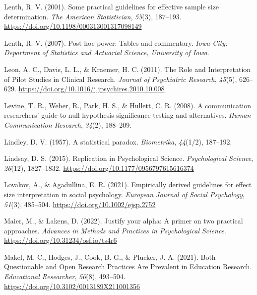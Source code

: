 \documentclass[
  letterpaper,
  DIV=11,
  numbers=noendperiod]{scrreprt}
\newlength{\cslhangindent}
\newlength{\cslentryspacingunit} %
\newenvironment{CSLReferences}[2] %
 {%
  \setlength{\parindent}{0pt}
  \ifodd #1
  \let\oldpar\par
  \def\par{\hangindent=\cslhangindent\oldpar}
  \fi
  \setlength{\parskip}{#2\cslentryspacingunit}
 }%
 {}
\begin{document}
\begin{CSLReferences}{1}{0}
\leavevmode{}%
Lenth, R. V. (2001). Some practical guidelines for effective sample size
determination. \emph{The American Statistician}, \emph{55}(3), 187--193.
\url{https://doi.org/10.1198/000313001317098149}

\leavevmode{}%
Lenth, R. V. (2007). Post hoc power: Tables and commentary. \emph{Iowa
City: Department of Statistics and Actuarial Science, University of
Iowa}.

\leavevmode{}%
Leon, A. C., Davis, L. L., \& Kraemer, H. C. (2011). The {Role} and
{Interpretation} of {Pilot Studies} in {Clinical Research}.
\emph{Journal of Psychiatric Research}, \emph{45}(5), 626--629.
\url{https://doi.org/10.1016/j.jpsychires.2010.10.008}

\leavevmode{}%
Levine, T. R., Weber, R., Park, H. S., \& Hullett, C. R. (2008). A
communication researchers' guide to null hypothesis significance testing
and alternatives. \emph{Human Communication Research}, \emph{34}(2),
188--209.

\leavevmode{}%
Lindley, D. V. (1957). A statistical paradox. \emph{Biometrika},
\emph{44}(1/2), 187--192.

\leavevmode{}%
Lindsay, D. S. (2015). Replication in {Psychological Science}.
\emph{Psychological Science}, \emph{26}(12), 1827--1832.
\url{https://doi.org/10.1177/0956797615616374}

\leavevmode{}%
Lovakov, A., \& Agadullina, E. R. (2021). Empirically derived guidelines
for effect size interpretation in social psychology. \emph{European
Journal of Social Psychology}, \emph{51}(3), 485--504.
\url{https://doi.org/10.1002/ejsp.2752}

\leavevmode{}%
Maier, M., \& Lakens, D. (2022). Justify your alpha: {A} primer on two
practical approaches. \emph{Advances in Methods and Practices in
Psychological Science}. \url{https://doi.org/10.31234/osf.io/ts4r6}

\leavevmode{}%
Makel, M. C., Hodges, J., Cook, B. G., \& Plucker, J. A. (2021). Both
{Questionable} and {Open Research Practices Are Prevalent} in {Education
Research}. \emph{Educational Researcher}, \emph{50}(8), 493--504.
\url{https://doi.org/10.3102/0013189X211001356}


\end{CSLReferences}
\end{document}
